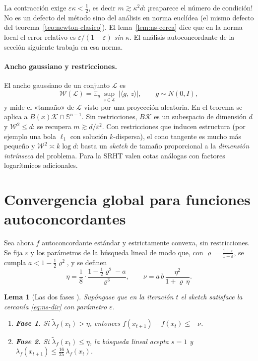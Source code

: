 \documentclass[11pt,a4paper,oneside]{book}
\newtheorem{lema}[teorema]{Lema}
\theoremstyle{definition}
\theoremstyle{remark}
\newcommand{\E}{\mathbb{E}}
\newcommand{\cK}{\mathcal{K}}
\newcommand{\cW}{\mathcal{W}}
\newcommand{\eps}{\varepsilon}
\newcommand{\abs}[1]{\left\lvert #1\right\rvert}
\newcommand{\ip}[2]{\langle #1,\, #2\rangle}
\newcommand{\lamf}{\lambda_f}
\newcommand{\lamt}{\widetilde{\lambda}_f}
\begin{document}
\begin{cuidado}
La contracción exige $\eps\kappa<\tfrac12$, es decir $m\gtrsim\kappa^2d$: ¡reaparece el número de condición! No es
un defecto del método sino del análisis en norma euclídea (el mismo defecto del
teorema~\ref{teo:newton-clasico}). El lema~\ref{lem:ns-cerca} dice que en la norma local el error relativo es
$\eps/(1-\eps)$ \emph{sin} $\kappa$. El análisis autoconcordante de la sección siguiente trabaja en esa norma.
\end{cuidado}

\paragraph{Ancho gaussiano y restricciones.} El ancho gaussiano de un conjunto $\mathcal L$ es
\[ \cW(\mathcal L)=\E_g\,\sup_{z\in\mathcal L}\,\abs{\ip{g}{z}},\qquad g\sim N(0,I), \]
y mide el «tamaño» de $\mathcal L$ visto por una proyección aleatoria. En el teorema se aplica a $B(x)\cK\cap\mathbb S^{n-1}$. Sin restricciones, $B\cK$ es un subespacio
de dimensión $d$ y $\cW^2\le d$: se recupera $m\gtrsim d/\eps^2$. Con restricciones que inducen estructura (por
ejemplo una bola $\ell_1$ con solución $k$-dispersa), el cono tangente es mucho más pequeño y
$\cW^2\asymp k\log d$: basta un \emph{sketch} de tamaño proporcional a la \emph{dimensión intrínseca} del problema.
Para la SRHT valen cotas análogas con factores logarítmicos adicionales.

\section{Convergencia global para funciones autoconcordantes}

Sea ahora $f$ autoconcordante estándar y estrictamente convexa, sin restricciones. Se fija $\eps$ y los
parámetros de la búsqueda lineal de modo que, con $\varrho=\frac{1+\eps}{1-\eps}$, se cumpla
$a<1-\tfrac12\varrho^2$, y se definen
\begin{equation}\label{eq:eta-nu}
  \eta=\frac18\cdot\frac{1-\frac12\varrho^2-a}{\varrho^{3}},\qquad\nu=a\,b\,\frac{\eta^2}{1+\varrho\,\eta}.
\end{equation}

\begin{lema}[Las dos fases {\cite[Lema~3]{PW17}}]\label{lem:pw-fases}
Supóngase que en la iteración $t$ el \emph{sketch} satisface la cercanía \eqref{eq:ns-dir} con parámetro $\eps$.
\begin{enumerate}[label=(\alph*)]
  \item \textbf{Fase 1.} Si $\lamt(x_t)>\eta$, entonces $f(x_{t+1})-f(x_t)\le-\nu$.
  \item \textbf{Fase 2.} Si $\lamt(x_t)\le\eta$, la búsqueda lineal acepta $s=1$ y
        $\lamf(x_{t+1})\le\tfrac{16}{25}\,\lamf(x_t)$.
\end{enumerate}
\end{lema}
\end{document}
